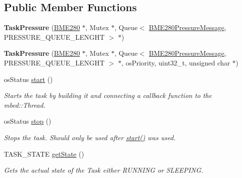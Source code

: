 \subsection*{Public Member Functions}
\begin{DoxyCompactItemize}
\item 
\hypertarget{class_task_pressure_a52693ee5b203587a085d178eb4c6d3d9}{}{\bfseries Task\+Pressure} (\hyperlink{class_b_m_e280}{B\+M\+E280} $\ast$, Mutex $\ast$, Queue$<$ \hyperlink{class_b_m_e280_pressure_message}{B\+M\+E280\+Pressure\+Message}, P\+R\+E\+S\+S\+U\+R\+E\+\_\+\+Q\+U\+E\+U\+E\+\_\+\+L\+E\+N\+G\+H\+T $>$ $\ast$)\label{class_task_pressure_a52693ee5b203587a085d178eb4c6d3d9}

\item 
\hypertarget{class_task_pressure_a0768827efc8c603dbaa43d9c392282b9}{}{\bfseries Task\+Pressure} (\hyperlink{class_b_m_e280}{B\+M\+E280} $\ast$, Mutex $\ast$, Queue$<$ \hyperlink{class_b_m_e280_pressure_message}{B\+M\+E280\+Pressure\+Message}, P\+R\+E\+S\+S\+U\+R\+E\+\_\+\+Q\+U\+E\+U\+E\+\_\+\+L\+E\+N\+G\+H\+T $>$ $\ast$, os\+Priority, uint32\+\_\+t, unsigned char $\ast$)\label{class_task_pressure_a0768827efc8c603dbaa43d9c392282b9}

\item 
os\+Status \hyperlink{class_task_pressure_a702e7f98f983c27a8cc70b4f7d11fbda}{start} ()
\begin{DoxyCompactList}\small\item\em Starts the task by building it and connecting a callback function to the mbed\+::\+Thread. \end{DoxyCompactList}\item 
os\+Status \hyperlink{class_task_pressure_a220dadca7ab645b909d4929711bdc54f}{stop} ()
\begin{DoxyCompactList}\small\item\em Stops the task. Should only be used after \hyperlink{class_task_pressure_a702e7f98f983c27a8cc70b4f7d11fbda}{start()} was used. \end{DoxyCompactList}\item 
T\+A\+S\+K\+\_\+\+S\+T\+A\+T\+E \hyperlink{class_task_pressure_a441370afd73e806f76823f2b797e1db7}{get\+State} ()
\begin{DoxyCompactList}\small\item\em Gets the actual state of the Task either R\+U\+N\+N\+I\+N\+G or S\+L\+E\+E\+P\+I\+N\+G. \end{DoxyCompactList}\end{DoxyCompactItemize}


